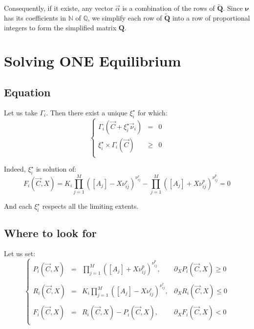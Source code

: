 \documentclass[aps,12pt]{revtex4}
\begin{document}
Consequently, if it existe, any vector $\vec{\alpha}$ is a combination of the rows of $\bm{\tilde Q}$.
Since $\bm{\nu}$ has its coefficients in $\mathbb{N}$ of $\mathbb{Q}$, we simplify each row of 
$\bm{\tilde Q}$ into a row of proportional integers to form the simplified matrix $\bm{Q}$.


\section{Solving ONE Equilibrium}

\subsection{Equation}
Let us take $\Gamma_i$.
Then there exist a unique $\xi_i^\star$ for which:
\begin{equation}
\left\lbrace
\begin{array}{rcl}
	\Gamma_i(\vec{C} + \xi_i^\star \vec{\nu}_i ) & = & 0\\
	 \xi_i^\star \times \Gamma_i(\vec{C}) &\geq  &0\\
\end{array}
\right.
\end{equation}
 
Indeed, $\xi_i^\star$ is solution of:
\begin{equation}
	 F_i(\vec{C},X) =  K_i \prod_{j=1}^{M} \left([A_j] - X \nu^r_{ij}\right)^{\nu^r_{ij}} 
	- \prod_{j=1}^{M} \left([A_j] + X \nu^p_{ij} \right)^{\nu^p_{ij}} = 0
\end{equation} 

And each $\xi_i^\star$ respects all the limiting extents.

\subsection{Where to look for}
Let us set:
\begin{equation}
\left\lbrace
\begin{array}{rcll}
	P_i(\vec{C},X) & = & \displaystyle \prod_{j=1}^{M} \left([A_j] + X \nu^p_{ij} \right)^{\nu^p_{ij}}, & \partial_X P_i(\vec{C},X) \geq 0 \\
	\\
	R_i(\vec{C},X) & = & \displaystyle K_i \prod_{j=1}^{M} \left([A_j] - X \nu^r_{ij}\right)^{\nu^r_{ij}}, & \partial_X R_i(\vec{C},X) \leq 0 \\
	\\
	 F_i(\vec{C},X) & = & R_i(\vec{C},X)  - P_i(\vec{C},X), & \partial_X F_i(\vec{C},X) < 0\\
\end{array}
\right.
\end{equation}
\end{document}
